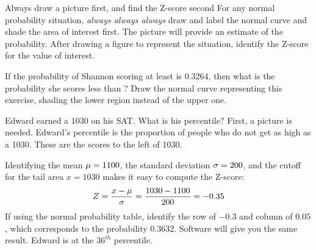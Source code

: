\begin{onebox}{Always draw a picture first,
    and find the Z-score second}
  For any normal probability situation,
  \emph{always always always} draw and label the
  normal curve and shade the area of interest first.
  The picture will provide an estimate of the probability.
  After drawing a figure to represent the situation,
  identify the Z-score for the value of interest.
\end{onebox}

\begin{exercisewrap}
\begin{nexercise}
If the probability of Shannon scoring at least \shannonsat{}
is 0.3264, then what is the probability she scores less than
\shannonsat{}?
Draw the normal curve representing this exercise,
shading the lower region instead of the upper one.\footnotemark{}
\end{nexercise}
\end{exercisewrap}


\newcommand{\edwardsat}{1030}
\newcommand{\edwardsatz}{-0.35}
\newcommand{\edwardsatlower}{0.3632}
\begin{examplewrap}
\begin{nexample}{Edward earned a \edwardsat{} on his SAT.
    What is his percentile?}
  \label{edwardSatBelow\edwardsat{}}%
  First, a picture is needed.
  Edward's percentile is the proportion of people who do not
  get as high as a \edwardsat{}.
  These are the scores to the left of \edwardsat{}.
\begin{center}
\end{center}
Identifying the mean $\mu=1100{}$, the standard
deviation $\sigma=200{}$, and the cutoff for the tail
area $x=\edwardsat{}$ makes it easy to compute the Z-score:
\begin{align*}
Z
  = \frac{x - \mu}{\sigma}
  = \frac{\edwardsat{} - \satmean{}}{\satsd{}}
  = \edwardsatz{}
\end{align*}
If using the normal probability table,
identify the row of $-0.3$ and column of $0.05$,
which corresponds to the probability $0.3632$.
Software will give you the same result.
Edward is at the $36^{th}$ percentile.
\end{nexample}
\end{examplewrap}

